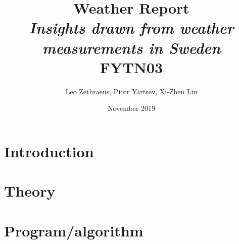 \documentclass[a4paper]{article}
\begin{document}
\title{Weather Report\\\textit{Insights drawn from weather measurements in Sweden} \\ FYTN03}
\author{Leo Zethraeus, 
Piotr Yartsev, Xi-Zhen Liu} %
\date{November 2019} %
\maketitle
\newpage
\tableofcontents

\newpage

\section{Introduction}

\section{Theory}



\section{Program/algorithm}
\end{document}
